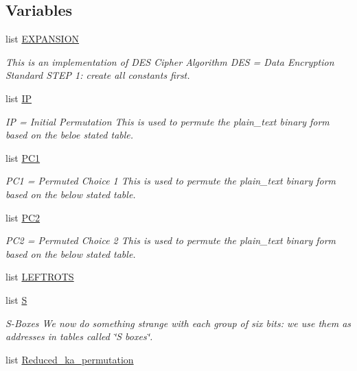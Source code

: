 \subsection*{Variables}
\begin{DoxyCompactItemize}
\item 
list \hyperlink{namespaceDESKeygen_af93868fb830bf819ba3a974f70268bc3}{E\+X\+P\+A\+N\+S\+I\+ON}
\begin{DoxyCompactList}\small\item\em This is an implementation of D\+ES Cipher Algorithm D\+ES = Data Encryption Standard S\+T\+EP 1\+: create all constants first. \end{DoxyCompactList}\item 
list \hyperlink{namespaceDESKeygen_a6ccc6c2aae713404c9ba45ca7959a85c}{IP}
\begin{DoxyCompactList}\small\item\em IP = Initial Permutation This is used to permute the plain\+\_\+text binary form based on the beloe stated table. \end{DoxyCompactList}\item 
list \hyperlink{namespaceDESKeygen_ad9fa6cbd0839d08d29221becb47ac2ba}{P\+C1}
\begin{DoxyCompactList}\small\item\em P\+C1 = Permuted Choice 1 This is used to permute the plain\+\_\+text binary form based on the below stated table. \end{DoxyCompactList}\item 
list \hyperlink{namespaceDESKeygen_aaa16a1cab6f290096983471082d523aa}{P\+C2}
\begin{DoxyCompactList}\small\item\em P\+C2 = Permuted Choice 2 This is used to permute the plain\+\_\+text binary form based on the below stated table. \end{DoxyCompactList}\item 
list \hyperlink{namespaceDESKeygen_a5f5d5fb8cd62da6f74e19f8c1c22a611}{L\+E\+F\+T\+R\+O\+TS}
\item 
list \hyperlink{namespaceDESKeygen_a6da8b8d78caa50ef61de1ccc5413dec7}{S}
\begin{DoxyCompactList}\small\item\em S-\/\+Boxes We now do something strange with each group of six bits\+: we use them as addresses in tables called \char`\"{}\+S boxes\char`\"{}. \end{DoxyCompactList}\item 
list \hyperlink{namespaceDESKeygen_a003266ecce54358bd8a478e22cd5f9a5}{Reduced\+\_\+ka\+\_\+permutation}

\end{DoxyCompactItemize}
